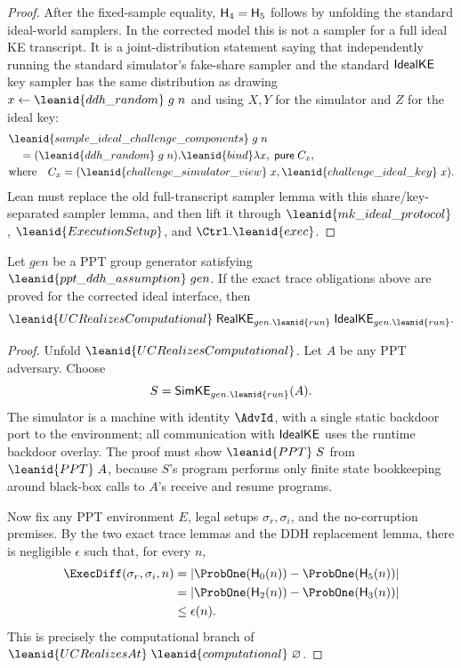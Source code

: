 \begin{proof}
After the fixed-sample equality, \(\mathsf{H}_4=\mathsf{H}_5\) follows by unfolding the
standard ideal-world samplers.  In the corrected model this is not a sampler
for a full ideal KE transcript.  It is a joint-distribution statement saying
that independently running the standard simulator's fake-share sampler and the
standard \(\mathsf{IdealKE}\) key sampler has the same distribution as drawing
\(x\leftarrow\leanid{ddh\_random}\;g\;n\) and using \(X,Y\) for the simulator
and \(Z\) for the ideal key:
\[
\begin{aligned}
&\leanid{sample\_ideal\_challenge\_components}\;g\;n\\
&\quad =
  (\leanid{ddh\_random}\;g\;n).\leanid{bind}
    \lambda x,\;
      \mathsf{pure}\;C_x,\\
&\text{where}\quad
  C_x =
    (\leanid{challenge\_simulator\_view}\;x,
     \leanid{challenge\_ideal\_key}\;x).
\end{aligned}
\]
Lean must replace the old full-transcript sampler lemma with this
share/key-separated sampler lemma, and then lift it through
\(\leanid{mk\_ideal\_protocol}\), \(\leanid{ExecutionSetup}\), and
\(\Ctrl.\leanid{exec}\).
\end{proof}

\begin{theorem}
Let \(gen\) be a PPT group generator satisfying
\(\leanid{ppt\_ddh\_assumption}\;gen\).  If the exact trace obligations above
are proved for the corrected ideal interface, then
\[
  \leanid{UCRealizesComputational}\;
    \RealKE_{gen.\leanid{run}}\;\IdealKE_{gen.\leanid{run}} .
\]
\end{theorem}

\begin{proof}
Unfold \(\leanid{UCRealizesComputational}\).  Let \(A\) be any PPT adversary.
Choose
\[
  S=\SimKE_{gen.\leanid{run}}(A).
\]
The simulator is a machine with identity \(\AdvId\), with a single static
backdoor port to the environment; all communication with \(\mathsf{IdealKE}\) uses the
runtime backdoor overlay.  The proof must show \(\leanid{PPT}\;S\) from
\(\leanid{PPT}\;A\), because \(S\)'s program performs only finite state
bookkeeping around black-box calls to \(A\)'s receive and resume programs.

Now fix any PPT environment \(E\), legal setups \(\sigma_r,\sigma_i\), and the
no-corruption premises.  By the two exact trace lemmas and the DDH replacement
lemma, there is negligible \(\epsilon\) such that, for every \(n\),
\[
\begin{aligned}
\ExecDiff(\sigma_r,\sigma_i,n)
&=
\left|
  \ProbOne(\Hyb_0(n))-\ProbOne(\Hyb_5(n))
\right|\\
&=
\left|
  \ProbOne(\Hyb_2(n))-\ProbOne(\Hyb_3(n))
\right|\\
&\le \epsilon(n).
\end{aligned}
\]
This is precisely the computational branch of
\(\leanid{UCRealizesAt}\;\leanid{computational}\;\varnothing\).
\end{proof}

